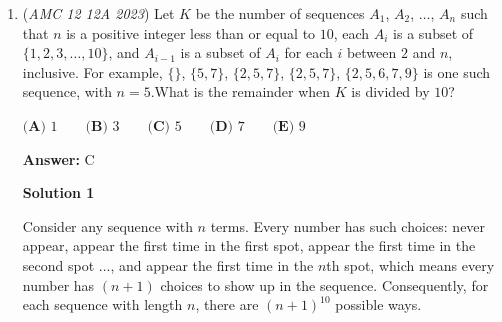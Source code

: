 \begin{enumerate}
 so $x=y=1$ and $a=\frac12, b=1$ is the only solution.

 answer is $\boxed{\textbf {(B)}}$




\textbf{Solution 4 Algebraic Method}

Let $m = 2a+b$ and $z = ab$. The given equation is $(1+2a)(2+2b)(2a+b) = 32ab$.Expanding the first two terms as $(2 + 2b + 4a + 4ab)$ and substituting $m, z$:
 \[(2m + 4z + 2)m = 32z \implies m^2 + (2z+1)m - 16z = 0 \quad (1)\]Since $2a$ and $b$ are positive reals, they are the roots of $t^2 - mt + 2z = 0$. For real roots, the discriminant $D = m^2 - 8z \geq 0$, so $m^2 \geq 8z$. 

 From $(1)$, we have $16z = m^2 + (2z+1)m$. Substituting this into $16z \leq 2m^2$:
 \[m^2 + (2z+1)m \leq 2m^2 \implies (2z+1)m \leq m^2\]Since $m > 0$, we have $m \geq 2z+1$. Substituting this boundary back into $(1)$:
 \[(2z+1)^2 + (2z+1)(2z+1) - 16z \leq 0\]
 \[2(4z^2 + 4z + 1) - 16z \leq 0 \implies 8z^2 - 8z + 2 \leq 0 \implies 2(2z-1)^2 \leq 0\]This forces $(2z-1)^2 = 0$, so $z = \frac{1}{2}$. Plugging $z = \frac{1}{2}$ into $(1)$ gives $m^2 + 2m - 8 = 0$, so $m=2$ (as $m>0$).Solving $2a+b=2$ and $ab=1/2$ yields $(a, b) = (1/2, 1)$. This is the only solution, so the answer is $\boxed{\textbf{(B)}}$.

 


	\item (\textit{AMC 12 12A 2023}) Let $K$ be the number of sequences $A_1$, $A_2$, $\dots$, $A_n$ such that $n$ is a positive integer less than or equal to $10$, each $A_i$ is a subset of $\{1, 2, 3, \dots, 10\}$, and $A_{i-1}$ is a subset of $A_i$ for each $i$ between $2$ and $n$, inclusive. For example, $\{\}$, $\{5, 7\}$, $\{2, 5, 7\}$, $\{2, 5, 7\}$, $\{2, 5, 6, 7, 9\}$ is one such sequence, with $n = 5$.What is the remainder when $K$ is divided by $10$?


 $\textbf{(A) } 1 \qquad \textbf{(B) } 3 \qquad \textbf{(C) } 5 \qquad \textbf{(D) } 7 \qquad \textbf{(E) } 9$

 \textbf{Answer: }C



\textbf{Solution 1}

Consider any sequence with $n$ terms. Every number has such choices: never appear, appear the first time in the first spot, appear the first time in the second spot ..., and appear the first time in the $n$th spot, which means every number has $(n+1)$ choices to show up in the sequence. Consequently, for each sequence with length $n$, there are $(n+1)^{10}$ possible ways.


\end{enumerate}
